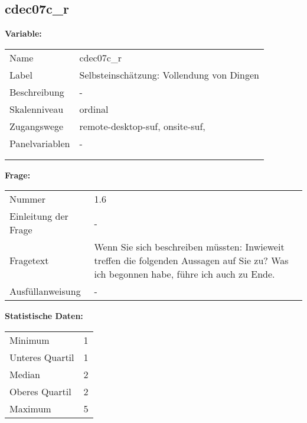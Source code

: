 	
	
	\subsection{cdec07c\_r}
	\label{subSection:cdec07c_r}

	\noindent\textbf{Variable:}\\
		\begin{tabular}{lL{11.3cm}}
			\label{tableVariable:cdec07c_r}
			Name & cdec07c\_r \\
			Label & Selbsteinschätzung: Vollendung von Dingen \\
			Beschreibung & - \\
			Skalenniveau & ordinal \\
			Zugangswege &
				remote-desktop-suf,
				onsite-suf,
 \\
			Panelvariablen & -
			 \\
			 \\
 \\
		\end{tabular}

		\vspace*{1 cm}
		\noindent\textbf{Frage:}\\
		\begin{tabular}{lL{11.3cm}}
			\label{tableQuestion:cdec07c_r}
			Nummer & 1.6 \\
			Einleitung der Frage & - \\
			Fragetext & Wenn Sie sich beschreiben müssten: Inwieweit treffen die folgenden Aussagen auf Sie zu?
Was ich begonnen habe, führe ich auch zu Ende. \\
			Ausfüllanweisung & - \\
		\end{tabular}


		\vspace*{1 cm}
		\noindent\textbf{Statistische Daten:}\\
			\begin{tabular}{ll}
				\label{tableStatistics:cdec07c_r}
					Minimum & 1 \\
					Unteres Quartil & 1 \\
					Median & 2 \\
					Oberes Quartil & 2 \\
					Maximum & 5 \\
			\end{tabular}



